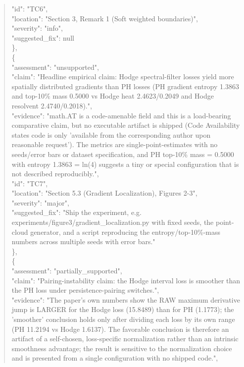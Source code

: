 \documentclass[11pt]{article}
\begin{document}
\begin{quote}
      "id": "TC6",\\
      "location": "Section 3, Remark 1 (Soft weighted boundaries)",\\
      "severity": "info",\\
      "suggested\_fix": null\\
    \},\\
    \{\\
      "assessment": "unsupported",\\
      "claim": "Headline empirical claim: Hodge spectral-filter losses yield more spatially distributed gradients than PH losses (PH gradient entropy 1.3863 and top-10\% mass 0.5000 vs Hodge heat 2.4623/0.2049 and Hodge resolvent 2.4740/0.2018).",\\
      "evidence": "math.AT is a code-amenable field and this is a load-bearing comparative claim, but no executable artifact is shipped (Code Availability states code is only 'available from the corresponding author upon reasonable request'). The metrics are single-point-estimates with no seeds/error bars or dataset specification, and PH top-10\% mass = 0.5000 with entropy 1.3863 = ln(4) suggests a tiny or special configuration that is not described reproducibly.",\\
      "id": "TC7",\\
      "location": "Section 5.3 (Gradient Localization), Figures 2-3",\\
      "severity": "major",\\
      "suggested\_fix": "Ship the experiment, e.g. experiments/figure3/gradient\_localization.py with fixed seeds, the point-cloud generator, and a script reproducing the entropy/top-10\%-mass numbers across multiple seeds with error bars."\\
    \},\\
    \{\\
      "assessment": "partially\_supported",\\
      "claim": "Pairing-instability claim: the Hodge interval loss is smoother than the PH loss under persistence-pairing switches.",\\
      "evidence": "The paper's own numbers show the RAW maximum derivative jump is LARGER for the Hodge loss (15.8489) than for PH (1.1773); the 'smoother' conclusion holds only after dividing each loss by its own range (PH 11.2194 vs Hodge 1.6137). The favorable conclusion is therefore an artifact of a self-chosen, loss-specific normalization rather than an intrinsic smoothness advantage; the result is sensitive to the normalization choice and is presented from a single configuration with no shipped code.",\\

\end{quote}
\end{document}
